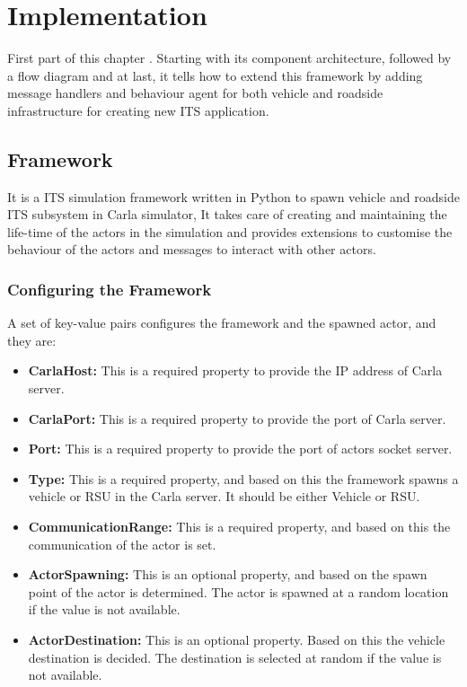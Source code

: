
\chapter{Implementation}
First part of this chapter . Starting with its component architecture, followed by a flow diagram and at last, it tells how to extend this framework by adding message handlers and behaviour agent for both vehicle and roadside infrastructure for creating new ITS application.

\section{Framework}
    It is a ITS simulation framework written in Python to spawn vehicle and roadside ITS subsystem in Carla simulator, It takes care of creating and maintaining the life-time of the actors in the simulation and provides extensions to customise the behaviour of the actors and messages to interact with other actors. 
    
\subsection{Configuring the Framework}
A set of key-value pairs configures the framework and the spawned actor, and they are:
\begin{itemize}
    
    \item \textbf{CarlaHost: } This is a required property to provide the IP address of Carla server. 
    \item \textbf{CarlaPort: } This is a required property to provide the port of Carla server.
    \item \textbf{Port: } This is a required property to provide the port of actors socket server.
    \item \textbf{Type: } This is a required property, and based on this the framework spawns a vehicle or RSU in the Carla server. It should be either Vehicle or RSU.
    \item \textbf{CommunicationRange: } This is a required property, and based on this the communication of the actor is set.
    \item \textbf{ActorSpawning: } This is an optional property, and based on the spawn point of the actor is determined. The actor is spawned at a random location if the value is not available.
    \item \textbf{ActorDestination: } This is an optional property. Based on this the vehicle destination is decided. The destination is selected at random if the value is not available.
\end{itemize}
